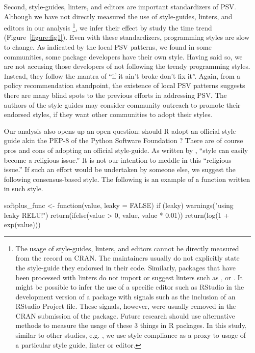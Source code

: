 Second, style-guides, linters, and editors are important standardizers of PSV. Although we have not directly measured the use of style-guides, linters, and editors in our analysis \footnote{The usage of style-guides, linters, and editors cannot be directly measured from the record on CRAN. The maintainers usually do not explicitly state the style-guide they endorsed in their code. Similarly, packages that have been processed with linters do not import or suggest linters such as ,  or . It might be possible to infer the use of a specific editor such as RStudio in the development version of a package with signals such as the inclusion of an RStudio Project file. These signals, however, were usually removed in the CRAN submission of the package. Future research should use alternative methods to measure the usage of these 3 things in R packages. In this study, similar to other studies, e.g. \citet{bafatakis:2019:PCS}, we use style compliance as a proxy to usage of a particular style guide, linter or editor.}, we infer their effect by study the time trend (Figure~\ref{figure:fig1}). Even with these standardizers, programming styles are slow to change. As indicated by the local PSV patterns, we found in some communities, some package developers have their own style. Having said so, we are not accusing those developers of not following the trendy programming styles. Instead, they follow the mantra of ``if it ain't broke don't fix it''. Again, from a policy recommendation standpoint, the existence of local PSV patterns suggests there are many blind spots to the previous efforts in addressing PSV. The authors of the style guides may consider community outreach to promote their endorsed styles, if they want other communities to adopt their styles.

Our analysis also opens up an open question: should R adopt an official style-guide akin the PEP-8 of the Python Software Foundation \citep{vanrossum}? There are of course pros and cons of adopting an official style-guide. As written by \citet{christiansen}, ``style can easily become a religious issue.'' It is not our intention to meddle in this ``religious issue.'' If such an effort would be undertaken by someone else, we suggest the following consensus-based style. The following is an example of a function written in such style.

\begin{example}
softplus_func <- function(value, leaky = FALSE) {
    if (leaky) {
        warnings("using leaky RELU!")
        return(ifelse(value > 0, value, value * 0.01))
    }
    return(log(1 + exp(value)))
}
\end{example}

